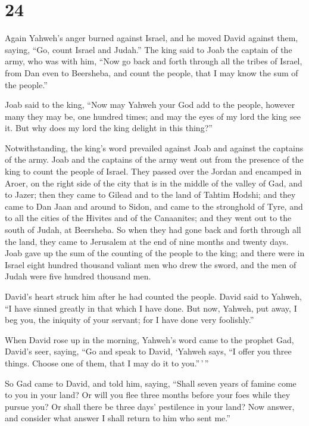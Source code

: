 \hypertarget{section-23}{%
\section{24}\label{section-23}}

 Again Yahweh's anger burned against Israel, and he moved
David against them, saying, ``Go, count Israel and Judah.'' 
The king said to Joab the captain of the army, who was with him, ``Now
go back and forth through all the tribes of Israel, from Dan even to
Beersheba, and count the people, that I may know the sum of the
people.''

 Joab said to the king, ``Now may Yahweh your God add to the
people, however many they may be, one hundred times; and may the eyes of
my lord the king see it. But why does my lord the king delight in this
thing?''

 Notwithstanding, the king's word prevailed against Joab and
against the captains of the army. Joab and the captains of the army went
out from the presence of the king to count the people of Israel.
 They passed over the Jordan and encamped in Aroer, on the
right side of the city that is in the middle of the valley of Gad, and
to Jazer;  then they came to Gilead and to the land of
Tahtim Hodshi; and they came to Dan Jaan and around to Sidon,
 and came to the stronghold of Tyre, and to all the cities
of the Hivites and of the Canaanites; and they went out to the south of
Judah, at Beersheba.  So when they had gone back and forth
through all the land, they came to Jerusalem at the end of nine months
and twenty days.  Joab gave up the sum of the counting of
the people to the king; and there were in Israel eight hundred thousand
valiant men who drew the sword, and the men of Judah were five hundred
thousand men.

 David's heart struck him after he had counted the people.
David said to Yahweh, ``I have sinned greatly in that which I have done.
But now, Yahweh, put away, I beg you, the iniquity of your servant; for
I have done very foolishly.''

 When David rose up in the morning, Yahweh's word came to
the prophet Gad, David's seer, saying,  ``Go and speak to
David, `Yahweh says, ``I offer you three things. Choose one of them,
that I may do it to you.''\,'\,''

 So Gad came to David, and told him, saying, ``Shall seven
years of famine come to you in your land? Or will you flee three months
before your foes while they pursue you? Or shall there be three days'
pestilence in your land? Now answer, and consider what answer I shall
return to him who sent me.''

